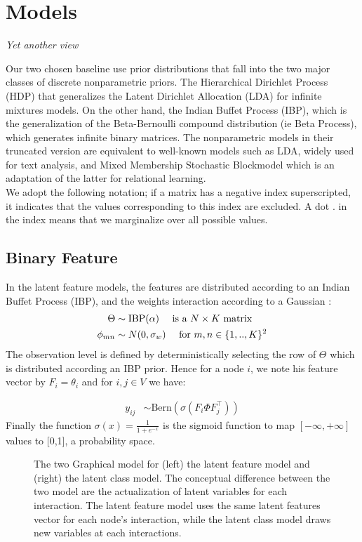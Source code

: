 \section{Models}
\emph{Yet another view} ~\\
\label{fig:bayes_net}

Our two chosen baseline use prior distributions that fall into the two major classes of discrete nonparametric priors. The Hierarchical Dirichlet Process (HDP) that generalizes the Latent Dirichlet Allocation (LDA) for infinite mixtures models. On the other hand, the Indian Buffet Process (IBP), which is the generalization of the Beta-Bernoulli compound distribution (ie Beta Process), which generates infinite binary matrices. The nonparametric models in their truncated version are equivalent to well-known models such as LDA, widely used for text analysis, and Mixed Membership Stochastic Blockmodel which is an adaptation of the latter for relational learning.~\\


We adopt the following notation; if a matrix has a negative index superscripted, it indicates that the values corresponding to this index are excluded. A dot $\bm{.}$ in the index means that we marginalize over all possible values.


\subsection{Binary Feature}
In the latent feature models, the features are distributed according to an Indian Buffet Process (IBP), and the weights interaction according to a Gaussian :
\begin{align}
\Theta &\sim \mathrm{IBP}(\alpha)  \quad\textnormal{ is a } N\times K \textnormal{ matrix}\\
\phi_{mn} &\sim N(0, \sigma_w) \quad\textnormal{ for } m,n \in \{1, .., K\}^2
\end{align}
The observation level is defined by deterministically selecting the row of $\Theta$ which is distributed according an IBP prior. Hence for a node $i$, we note his feature vector by $F_i = \theta_i$ and for $i, j \in V$ we have:

\begin{align}
y_{ij} &\sim \mathrm{Bern}(\sigma(F_i \Phi F_j^\top))
\end{align}
Finally the function $\sigma(x)= \frac{1}{1 + e^{-x}}$ is the sigmoid function to map $[-\infty, +\infty]$ values to [0,1], a probability space.

\begin{figure}[h]
	\centering
	\scalebox{0.88}{
	}
	\endminipage
	\scalebox{0.88}{
		}
	\endminipage
	\caption{The two Graphical model for (left) the latent feature model and (right) the latent class model. The conceptual difference between the two model are the actualization of latent variables for each interaction. The latent feature model uses the same latent features vector for each node's interaction, while the latent class model draws new variables at each interactions.}
	\label{fig:ilfrm}
\end{figure}

